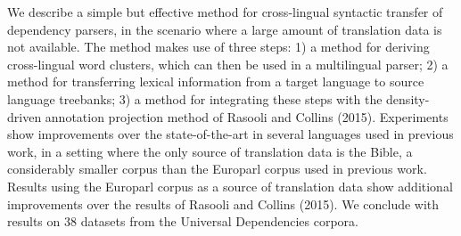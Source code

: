 We describe a simple but effective method for cross-lingual syntactic transfer of dependency parsers, in the scenario where a large amount of translation data is not available. The method makes use of three steps: 1) a method for deriving cross-lingual word clusters, which can then be used in a multilingual parser; 2) a method for transferring lexical information from a target language to source language treebanks; 3) a method for integrating these steps with the density-driven annotation projection method of Rasooli and Collins (2015). Experiments show improvements over the state-of-the-art in several languages used in previous work, in a setting where the only source of translation data is the Bible, a considerably smaller corpus than the Europarl corpus used in previous work. Results using the Europarl corpus as a source of translation data show additional improvements over the results of Rasooli and Collins (2015). We conclude with results on 38 datasets from the Universal Dependencies corpora.
